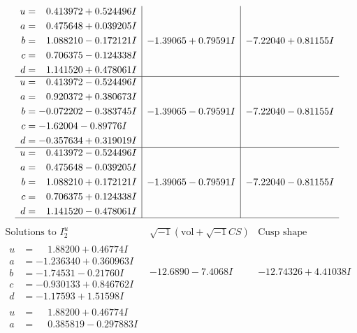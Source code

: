 \documentclass[1p]{elsarticle_modified}
\theoremstyle{definition}
\newcommand{\I}{\sqrt{-1}}
\begin{document}
$$\begin{array}{c|c|c}
\begin{aligned}
u &= \phantom{-}0.413972 + 0.524496 I \\
a &= \phantom{-}0.475648 + 0.039205 I \\
b &= \phantom{-}1.088210 - 0.172121 I \\
c &= \phantom{-}0.706375 - 0.124338 I \\
d &= \phantom{-}1.141520 + 0.478061 I\end{aligned}
 & -1.39065 + 0.79591 I & -7.22040 + 0.81155 I \\ \hline\begin{aligned}
u &= \phantom{-}0.413972 - 0.524496 I \\
a &= \phantom{-}0.920372 + 0.380673 I \\
b &= -0.072202 - 0.383745 I \\
c &= -1.62004 - 0.89776 I \\
d &= -0.357634 + 0.319019 I\end{aligned}
 & -1.39065 - 0.79591 I & -7.22040 - 0.81155 I \\ \hline\begin{aligned}
u &= \phantom{-}0.413972 - 0.524496 I \\
a &= \phantom{-}0.475648 - 0.039205 I \\
b &= \phantom{-}1.088210 + 0.172121 I \\
c &= \phantom{-}0.706375 + 0.124338 I \\
d &= \phantom{-}1.141520 - 0.478061 I\end{aligned}
 & -1.39065 - 0.79591 I & -7.22040 - 0.81155 I\\
 \hline 
 \end{array}$$\newpage$$\begin{array}{c|c|c}  
\text{Solutions to }I^u_{2}& \I (\text{vol} + \sqrt{-1}CS) & \text{Cusp shape}\\
 \hline 
\begin{aligned}
u &= \phantom{-}1.88200 + 0.46774 I \\
a &= -1.236340 + 0.360963 I \\
b &= -1.74531 - 0.21760 I \\
c &= -0.930133 + 0.846762 I \\
d &= -1.17593 + 1.51598 I\end{aligned}
 & -12.6890 - 7.4068 I & -12.74326 + 4.41038 I \\ \hline\begin{aligned}
u &= \phantom{-}1.88200 + 0.46774 I \\
a &= \phantom{-}0.385819 - 0.297883 I \\

\end{aligned}
\end{array}$$
\end{document}
